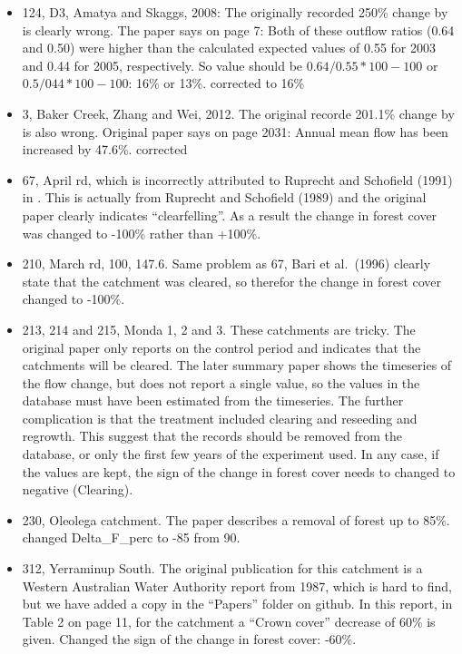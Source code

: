 \documentclass[]{elsarticle} %
\providecommand{\tightlist}{%
  \setlength{\itemsep}{0pt}\setlength{\parskip}{0pt}}
\begin{document}
\begin{itemize}
\tightlist
\item
  124, D3, Amatya and Skaggs, 2008: The originally recorded 250\% change by \citet{zhang2017} is clearly wrong. The paper says on page 7: Both of these outflow ratios (0.64 and 0.50) were higher than the calculated expected values of 0.55 for 2003 and 0.44 for 2005, respectively. So value should be \(0.64/0.55*100 - 100\) or \(0.5/044*100 - 100\): 16\% or 13\%. corrected to 16\%
\item
  3, Baker Creek, Zhang and Wei, 2012. The original recorde 201.1\% change by \citet{zhang2017} is also wrong. Original paper says on page 2031: Annual mean flow has been increased by 47.6\%. corrected\\
\item
  67, April rd, which is incorrectly attributed to Ruprecht and Schofield (1991) in \citet{zhang2017}. This is actually from Ruprecht and Schofield (1989) and the original paper clearly indicates ``clearfelling''. As a result the change in forest cover was changed to -100\% rather than +100\%.\\
\item
  210, March rd, 100, 147.6. Same problem as 67, Bari et al.~(1996) clearly state that the catchment was cleared, so therefor the change in forest cover changed to -100\%.\\
\item
  213, 214 and 215, Monda 1, 2 and 3. These catchments are tricky. The original paper \citep{oshaughnessy1979} only reports on the control period and indicates that the catchments will be cleared. The later summary paper \citep{watson2001} shows the timeseries of the flow change, but does not report a single value, so the values in the database must have been estimated from the timeseries. The further complication is that the treatment included clearing and reseeding and regrowth. This suggest that the records should be removed from the database, or only the first few years of the experiment used. In any case, if the values are kept, the sign of the change in forest cover needs to changed to negative (Clearing).\\
\item
  230, Oleolega catchment. The paper describes a removal of forest up to 85\%. changed Delta\_F\_perc to -85 from 90.\\
\item
  312, Yerraminup South. The original publication for this catchment is a Western Australian Water Authority report from 1987, which is hard to find, but we have added a copy in the ``Papers'' folder on github. In this report, in Table 2 on page 11, for the catchment a ``Crown cover'' decrease of 60\% is given. Changed the sign of the change in forest cover: -60\%.\\

\end{itemize}
\end{document}
